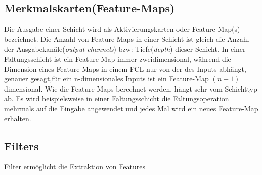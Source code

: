 \documentclass[12pt,a4paper]{scrartcl}
\numberwithin{equation}{section}
\begin{document}
\subsection{Merkmalskarten(Feature-Maps)}
Die Ausgabe einer Schicht wird als Aktivierungskarten oder Feature-Map(s) bezeichnet. Die Anzahl von Feature-Maps in einer Schicht ist gleich die Anzahl der Ausgabekanäle(\textit{output channels}) bzw: Tiefe(\textit{depth}) dieser Schicht.
In einer Faltungsschicht ist ein Feature-Map immer zweidimensional, während die Dimension eines Feature-Maps in einem \ac{FCL} nur von der des Inputs abhängt, genauer gesagt,für ein n-dimensionales Inputs ist ein Feature-Map $ (n-1) $dimensional.
Wie die Feature-Maps berechnet werden, hängt sehr vom Schichttyp ab. Es wird beispielsweise in einer Faltungsschicht die Faltungsoperation mehrmals auf die Eingabe angewendet und jedes Mal wird ein neues Feature-Map erhalten.

\subsection{Filters}\label{Filter}
Filter ermöglicht die Extraktion von Features 
\end{document}
